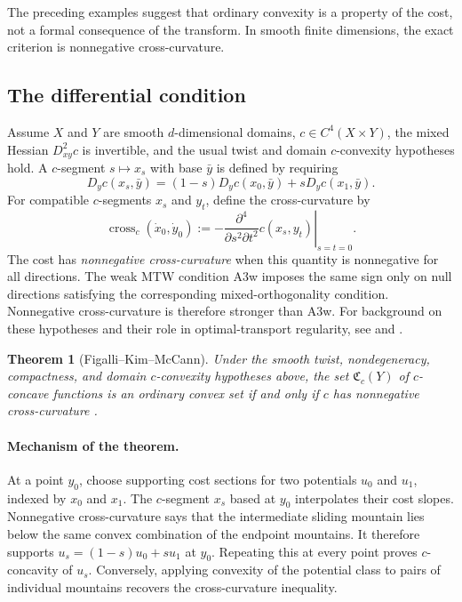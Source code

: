 \documentclass[11pt,a4paper]{article}
\newtheorem{theorem}{Theorem}[section]
\theoremstyle{definition}
\theoremstyle{remark}
\newcommand{\Cfrak}{\mathfrak C}
\begin{document}
The preceding examples suggest that ordinary convexity is a property of the
cost, not a formal consequence of the transform. In smooth finite dimensions,
the exact criterion is nonnegative cross-curvature.

\subsection{The differential condition}

Assume $X$ and $Y$ are smooth $d$-dimensional domains, $c\in C^4(X\times Y)$,
the mixed Hessian $D^2_{xy}c$ is invertible, and the usual twist and domain
$c$-convexity hypotheses hold. A $c$-segment $s\mapsto x_s$ with base
$\bar y$ is defined by requiring
\[
  D_yc(x_s,\bar y)
  =(1-s)D_yc(x_0,\bar y)+sD_yc(x_1,\bar y).
\]
For compatible $c$-segments $x_s$ and $y_t$, define the cross-curvature by
\begin{equation}\label{eq:cross-curvature}
  \operatorname{cross}_c(\dot x_0,\dot y_0)
  :=-\left.\frac{\partial^4}{\partial s^2\partial t^2}
       c(x_s,y_t)\right|_{s=t=0}.
\end{equation}
The cost has \emph{nonnegative cross-curvature} when this quantity is
nonnegative for all directions. The weak MTW condition A3w imposes the same
sign only on null directions satisfying the corresponding mixed-orthogonality
condition. Nonnegative cross-curvature is therefore stronger than A3w.
For background on these hypotheses and their role in optimal-transport
regularity, see \citet{Villani2009} and \citet{KimMcCann2010}.

\begin{theorem}[Figalli--Kim--McCann]\label{thm:fkm}
Under the smooth twist, nondegeneracy, compactness, and domain $c$-convexity
hypotheses above, the set $\Cfrak_c(Y)$ of $c$-concave functions is an ordinary
convex set if and only if $c$ has nonnegative cross-curvature
\citep{FigalliKimMcCann2011}.
\end{theorem}

\paragraph{Mechanism of the theorem.}
At a point $y_0$, choose supporting cost sections for two potentials $u_0$ and
$u_1$, indexed by $x_0$ and $x_1$. The $c$-segment $x_s$ based at $y_0$
interpolates their cost slopes. Nonnegative cross-curvature says that the
intermediate sliding mountain lies below the same convex combination of the
endpoint mountains. It therefore supports
$u_s=(1-s)u_0+su_1$ at $y_0$. Repeating this at every point proves
$c$-concavity of $u_s$. Conversely, applying convexity of the potential class
to pairs of individual mountains recovers the cross-curvature inequality.
\end{document}
